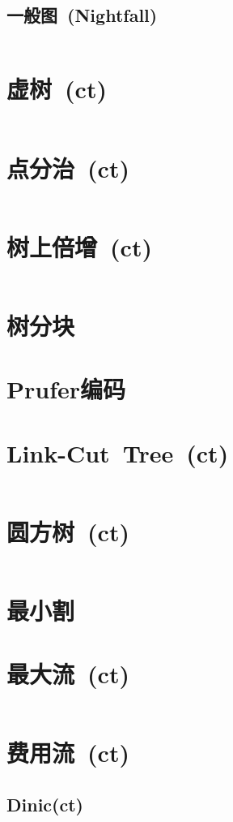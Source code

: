 	\subsection*{一般图\ \small(Nightfall)}
		\inputminted{cpp}{GraphTheory/dominator_tree.cpp}
\section{虚树\ \small(ct)}
	\inputminted{cpp}{GraphTheory/virtual_tree.cpp}
\section{点分治\ \small(ct)}
	\inputminted{cpp}{GraphTheory/divide_conquer_on_tree.cpp}
\section{树上倍增\ \small(ct)}
	\inputminted{cpp}{GraphTheory/multiplier_on_tree.cpp}
\section{树分块}
\section{Prufer编码}
\section{Link-Cut\ Tree\ \small(ct)}
	\inputminted{cpp}{GraphTheory/link_cut_tree.cpp}
\section{圆方树\ \small(ct)}
	\inputminted{cpp}{GraphTheory/circle_square_tree.cpp}
\section{最小割}
\section{最大流\ \small(ct)}
	\inputminted{cpp}{GraphTheory/dinic.cpp}
\section{费用流\ \small(ct)}
	\subsection*{Dinic(ct)}
		\inputminted{cpp}{GraphTheory/min_cost_max_flow.cpp}
